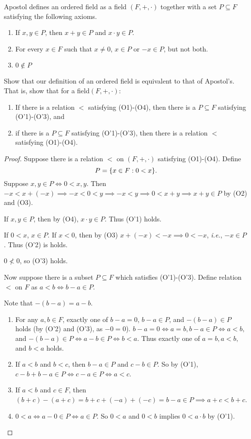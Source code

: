 \documentclass[12pt]{article}
\begin{document}
\begin{problem}
    Apostol defines an ordered field as a field $(F, +, \cdot)$ together with a set $P \subseteq F$ satisfying the following axioms.
    \begin{enumerate}[label=(O'\arabic*)]
        \item If $x, y \in P$, then $x + y \in P$ and $x \cdot y \in P$.
        \item For every $x \in F$ such that $x \neq 0$, $x \in P$ or $-x \in P$, but not both.
        \item $0 \notin P$
    \end{enumerate}
    Show that our definition of an ordered field is equivalent to that of Apostol’s. That is, show that for a field$(F, +, \cdot)$:
    \begin{enumerate}[label=(\textit{\roman*})]
        \item If there is a relation $<$ satisfying (O1)-(O4), then there is a $P \subseteq F$ satisfying (O'1)-(O'3), and
        \item if there is a $P \subseteq F$ satisfying (O’1)-(O’3), then there is a relation $<$ satisfying (O1)-(O4).
    \end{enumerate}
\end{problem}
\begin{proof}
    Suppose there is a relation $<$ on $(F, +, \cdot)$ satisfying (O1)-(O4). Define \[
        P = \set{x \in F : 0 < x}.
    \]
    Suppose $x, y \in P \iff 0 < x, y$.
    Then  $-x < x + (-x) \implies -x < 0 < y \implies -x < y \implies 0 < x + y \implies x + y \in P$ by (O2) and (O3).

    If $x, y \in P$, then by (O4), $x \cdot y \in P$.
    Thus (O'1) holds.

    If $0 < x$, $x \in P$.
    If $x < 0$, then by (O3) $x + (-x) < -x \implies 0 < -x$, \emph{i.e.}, $-x \in P$. Thus (O'2) is holds.

    $0 \not< 0$, so (O'3) holds.

    Now suppose there is a subset $P \subseteq F$ which satisfies (O'1)-(O'3).
    Define relation $<$ on $F$ as $a < b \iff b - a \in P $.

    Note that $-(b - a) = a - b$.
    \begin{enumerate}[label=(O\arabic*)]
        \item For any $a, b \in F$, exactly one of $b - a = 0$, $b - a \in P$, and $-(b - a) \in P$ holds (by (O'2) and (O'3), as $-0 = 0$).
        $b - a = 0 \iff a = b, b - a \in P \iff a < b,$ and $-(b - a) \in P \iff a - b \in P \iff b < a$.
        Thus exactly one of $a = b, a < b,$ and $b < a$ holds.
        \item If $a < b$ and $b < c$, then $b - a \in P$ and $c - b \in P$.
        So by (O'1), $c - b + b - a \in P \iff c - a \in P \iff a < c$.
        \item If $a < b$ and $c \in F$, then $(b + c) - (a + c) = b + c + (-a) + (-c) = b - a \in P \implies a + c < b + c$.
        \item $0 < a \iff a - 0 \in P \iff a \in P$.
        So $0 < a$ and $0 < b$ implies $0 < a \cdot b$ by (O'1). \qedhere
    \end{enumerate}
\end{proof}
\end{document}
